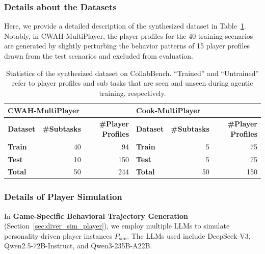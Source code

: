 \documentclass{article}
\theoremstyle{plain}
\theoremstyle{definition}
\theoremstyle{remark}
\begin{document}
\subsubsection{Details about the Datasets}
Here, we provide a detailed description of the synthesized dataset in Table~\ref{exp:tab:data}. Notably, in CWAH-MultiPlayer, the player profiles for the 40 training scenarios are generated by slightly perturbing the behavior patterns of 15 player profiles drawn from the test scenarios and excluded from evaluation.
\begin{table}[htbp]
  \centering
  \caption{Statistics of the synthesized dataset on CollabBench. ``Trained'' and ``Untrained'' refer to player profiles and sub tasks that are seen and unseen during agentic training, respectively.}
    \begin{tabular}{lrr|lrr}
    \toprule
    \multicolumn{3}{l|}{\textbf{CWAH-MultiPlayer}} & \multicolumn{3}{l}{\textbf{Cook-MultiPlayer}} \\
    \midrule
    \textbf{Dataset} & \textbf{\#Subtasks} & \textbf{\#Player Profiles} & \textbf{Dataset} & \textbf{\#Subtasks} & \textbf{\#Player Profiles} \\
    \midrule
    \textbf{Train} & 40    & 94    & \textbf{Train} & 5     & 75 \\
    \textbf{Test} & 10    & 150   & \textbf{Test} & 5     & 75 \\
    \midrule
    \textbf{Total} & 50    & 244   & \textbf{Total} & 50    & 150 \\
    \bottomrule
    \end{tabular}%
  \label{exp:tab:data}%
\end{table}%
\subsubsection{Details of Player          Simulation}\label{appx:det_player_sim}
In \textbf{Game-Specific Behavioral Trajectory Generation} (Section~\ref{sec:diver_sim_player}), we employ multiple LLMs to simulate personality-driven player instances $P_{\text{sim}}$. The LLMs used include DeepSeek-V3, Qwen2.5-72B-Instruct, and Qwen3-235B-A22B. 
\end{document}
